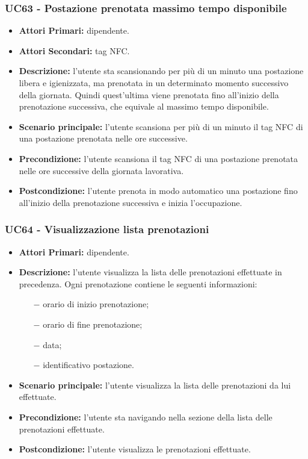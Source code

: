 \subsubsection{ UC63 - Postazione prenotata massimo tempo disponibile}
\begin{itemize}
	\item\textbf{Attori Primari:} dipendente.
	\item\textbf{Attori Secondari:} tag NFC.
	\item\textbf{Descrizione:} l'utente sta scansionando per più di un minuto una postazione libera e igienizzata, ma prenotata in un determinato momento successivo della giornata. Quindi quest'ultima viene prenotata fino all'inizio della prenotazione successiva, che equivale al massimo tempo disponibile.
	\item\textbf{Scenario principale:} l'utente scansiona per più di un minuto il tag NFC di una postazione prenotata nelle ore successive.
	\item\textbf{Precondizione:} l'utente scansiona il tag NFC di una postazione prenotata nelle ore successive della giornata lavorativa.
	\item\textbf{Postcondizione:} l'utente prenota in modo automatico una postazione fino all'inizio della prenotazione successiva e inizia l'occupazione.
\end{itemize}

\subsubsection{ UC64 - Visualizzazione lista prenotazioni}
\begin{itemize}
	\item\textbf{Attori Primari:} dipendente.
	\item\textbf{Descrizione:} l'utente visualizza la lista delle prenotazioni effettuate in precedenza. Ogni prenotazione contiene le seguenti informazioni:
	\begin{itemize}
		\item[$-$] orario di inizio prenotazione;
		\item[$-$] orario di fine prenotazione;
		\item[$-$] data;
		\item[$-$] identificativo postazione.
	\end{itemize}
	\item\textbf{Scenario principale:} l’utente visualizza la lista delle prenotazioni da lui effettuate.
	\item\textbf{Precondizione:} l'utente sta navigando nella sezione della lista delle prenotazioni effettuate.
	\item\textbf{Postcondizione:} l’utente visualizza le prenotazioni effettuate.
\end{itemize}

